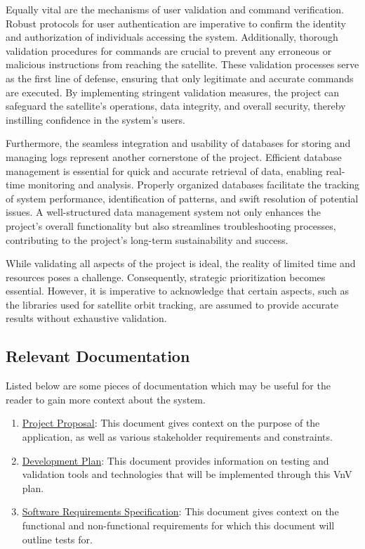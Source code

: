 \documentclass[12pt, titlepage]{article}
\begin{document}
Equally vital are the mechanisms of user validation and command verification. Robust protocols for user authentication are imperative to confirm the identity and authorization of individuals accessing the system. Additionally, thorough validation procedures for commands are crucial to prevent any erroneous or malicious instructions from reaching the satellite. These validation processes serve as the first line of defense, ensuring that only legitimate and accurate commands are executed. By implementing stringent validation measures, the project can safeguard the satellite's operations, data integrity, and overall security, thereby instilling confidence in the system's users.

Furthermore, the seamless integration and usability of databases for storing and managing logs represent another cornerstone of the project. Efficient database management is essential for quick and accurate retrieval of data, enabling real-time monitoring and analysis. Properly organized databases facilitate the tracking of system performance, identification of patterns, and swift resolution of potential issues. A well-structured data management system not only enhances the project's overall functionality but also streamlines troubleshooting processes, contributing to the project's long-term sustainability and success.

While validating all aspects of the project is ideal, the reality of limited time and resources poses a challenge. Consequently, strategic prioritization becomes essential. However, it is imperative to acknowledge that certain aspects, such as the libraries used for satellite orbit tracking, are assumed to provide accurate results without exhaustive validation.


\subsection{Relevant Documentation}

Listed below are some pieces of documentation which may be useful for the reader to gain more context about the system.

\begin{enumerate}
    \item \href{https://github.com/RishiVaya/Lower_Earth_Orbiters/blob/main/Project%20Proposal.pdf}{Project Proposal}: This document gives context on the purpose of the application, as well as various stakeholder requirements and constraints. 
    \item \href{https://github.com/RishiVaya/Lower_Earth_Orbiters/blob/main/docs/DevelopmentPlan/Development_Plan.pdf}{Development Plan}: This document provides information on testing and validation tools and technologies that will be implemented through this VnV plan.
    \item \href{https://github.com/RishiVaya/Lower_Earth_Orbiters/blob/main/docs/SRS/SRS.pdf}{Software Requirements Specification}: This document gives context on the functional and non-functional requirements for which this document will outline tests for.
\end{enumerate}
\end{document}
